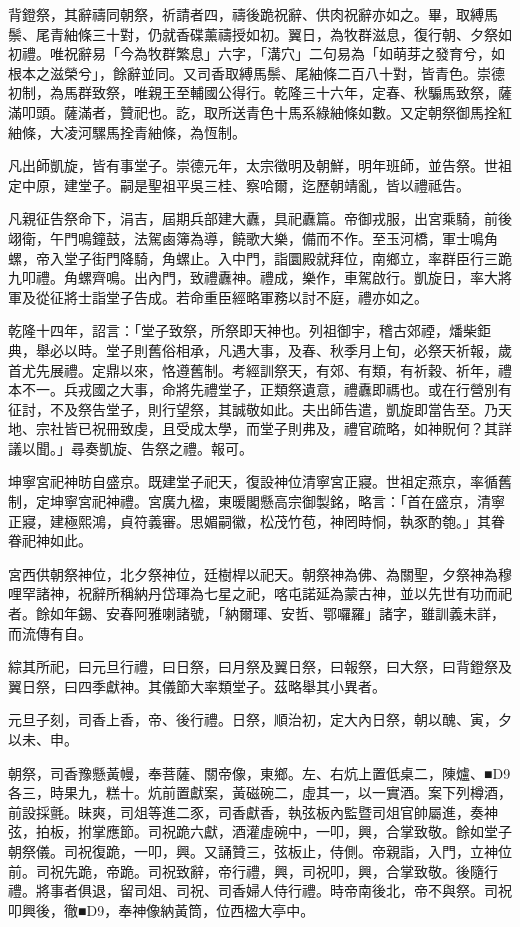 \begin{pinyinscope}
背鐙祭，其辭禱同朝祭，祈請者四，禱後跪祝辭、供肉祝辭亦如之。畢，取縛馬鬃、尾青紬條三十對，仍就香碟薰禱授如初。翼日，為牧群滋息，復行朝、夕祭如初禮。唯祝辭易「今為牧群繁息」六字，「溝穴」二句易為「如萌芽之發育兮，如根本之滋榮兮」，餘辭並同。又司香取縛馬鬃、尾紬條二百八十對，皆青色。崇德初制，為馬群致祭，唯親王至輔國公得行。乾隆三十六年，定春、秋騸馬致祭，薩滿叩頭。薩滿者，贊祀也。訖，取所送青色十馬系綠紬條如數。又定朝祭御馬拴紅紬條，大凌河騾馬拴青紬條，為恆制。

凡出師凱旋，皆有事堂子。崇德元年，太宗徵明及朝鮮，明年班師，並告祭。世祖定中原，建堂子。嗣是聖祖平吳三桂、察哈爾，迄歷朝靖亂，皆以禮祗告。

凡親征告祭命下，涓吉，屆期兵部建大纛，具祀纛篇。帝御戎服，出宮乘騎，前後翊衛，午門鳴鐘鼓，法駕鹵簿為導，饒歌大樂，備而不作。至玉河橋，軍士鳴角螺，帝入堂子街門降騎，角螺止。入中門，詣圜殿就拜位，南鄉立，率群臣行三跪九叩禮。角螺齊鳴。出內門，致禮纛神。禮成，樂作，車駕啟行。凱旋日，率大將軍及從征將士詣堂子告成。若命重臣經略軍務以討不庭，禮亦如之。

乾隆十四年，詔言：「堂子致祭，所祭即天神也。列祖御宇，稽古郊禋，燔柴鉅典，舉必以時。堂子則舊俗相承，凡遇大事，及春、秋季月上旬，必祭天祈報，歲首尤先展禮。定鼎以來，恪遵舊制。考經訓祭天，有郊、有類，有祈穀、祈年，禮本不一。兵戎國之大事，命將先禮堂子，正類祭遺意，禮纛即禡也。或在行營別有征討，不及祭告堂子，則行望祭，其誠敬如此。夫出師告遣，凱旋即當告至。乃天地、宗社皆已祝冊致虔，且受成太學，而堂子則弗及，禮官疏略，如神貺何？其詳議以聞。」尋奏凱旋、告祭之禮。報可。

坤寧宮祀神昉自盛京。既建堂子祀天，復設神位清寧宮正寢。世祖定燕京，率循舊制，定坤寧宮祀神禮。宮廣九楹，東暖閣懸高宗御製銘，略言：「首在盛京，清寧正寢，建極熙鴻，貞符義審。思媚嗣徽，松茂竹苞，神罔時恫，執豕酌匏。」其眷眷祀神如此。

宮西供朝祭神位，北夕祭神位，廷樹桿以祀天。朝祭神為佛、為關聖，夕祭神為穆哩罕諸神，祝辭所稱納丹岱琿為七星之祀，喀屯諾延為蒙古神，並以先世有功而祀者。餘如年錫、安春阿雅喇諸號，「納爾琿、安哲、鄂囉羅」諸字，雖訓義未詳，而流傳有自。

綜其所祀，曰元旦行禮，曰日祭，曰月祭及翼日祭，曰報祭，曰大祭，曰背鐙祭及翼日祭，曰四季獻神。其儀節大率類堂子。茲略舉其小異者。

元旦子刻，司香上香，帝、後行禮。日祭，順治初，定大內日祭，朝以醜、寅，夕以未、申。

朝祭，司香豫懸黃幔，奉菩薩、關帝像，東鄉。左、右炕上置低桌二，陳爐、■D9各三，時果九，糕十。炕前置獻案，黃磁碗二，虛其一，以一實酒。案下列樽酒，前設採氈。昧爽，司俎等進二豕，司香獻香，執弦板內監暨司俎官帥屬進，奏神弦，拍板，拊掌應節。司祝跪六獻，酒灌虛碗中，一叩，興，合掌致敬。餘如堂子朝祭儀。司祝復跪，一叩，興。又誦贊三，弦板止，侍側。帝親詣，入門，立神位前。司祝先跪，帝跪。司祝致辭，帝行禮，興，司祝叩，興，合掌致敬。後隨行禮。將事者俱退，留司俎、司祝、司香婦人侍行禮。時帝南後北，帝不與祭。司祝叩興後，徹■D9，奉神像納黃筒，位西楹大亭中。


\end{pinyinscope}
